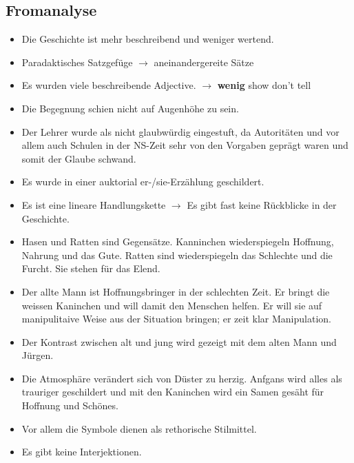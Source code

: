 \documentclass{article}
\begin{document}
\subsection{Fromanalyse}
\begin{itemize}[parsep=0pt]
    \item Die Geschichte ist mehr beschreibend und weniger wertend.
    \item Paradaktisches Satzgefüge $\rightarrow$ aneinandergereite Sätze
    \item Es wurden viele beschreibende Adjective. $\rightarrow$ \textbf{wenig} show don't tell
    \item Die Begegnung schien nicht auf Augenhöhe zu sein.
    \item Der Lehrer wurde als nicht glaubwürdig eingestuft, da Autoritäten und vor allem auch Schulen in der NS-Zeit sehr von den Vorgaben geprägt waren und somit der Glaube schwand.
    \item Es wurde in einer auktorial er-/sie-Erzählung geschildert.
    \item Es ist eine lineare Handlungskette $\rightarrow$ Es gibt fast keine Rückblicke in der Geschichte.
    \item Hasen und Ratten sind Gegensätze. Kanninchen wiederspiegeln Hoffnung, Nahrung und das Gute. Ratten sind wiederspiegeln das Schlechte und die Furcht. Sie stehen für das Elend.
    \item Der allte Mann ist Hoffnungsbringer in der schlechten Zeit. Er bringt die weissen Kaninchen und will damit den Menschen helfen. Er will sie auf manipulitaive Weise aus der Situation bringen; er zeit klar Manipulation.
    \item Der Kontrast zwischen alt und jung wird gezeigt mit dem alten Mann und Jürgen.
    \item Die Atmosphäre verändert sich von Düster zu herzig. Anfgans wird alles als trauriger geschildert und mit den Kaninchen wird ein Samen gesäht für Hoffnung und Schönes.
    \item Vor allem die Symbole dienen als rethorische Stilmittel.
    \item Es gibt keine Interjektionen.
\end{itemize}
\end{document}
